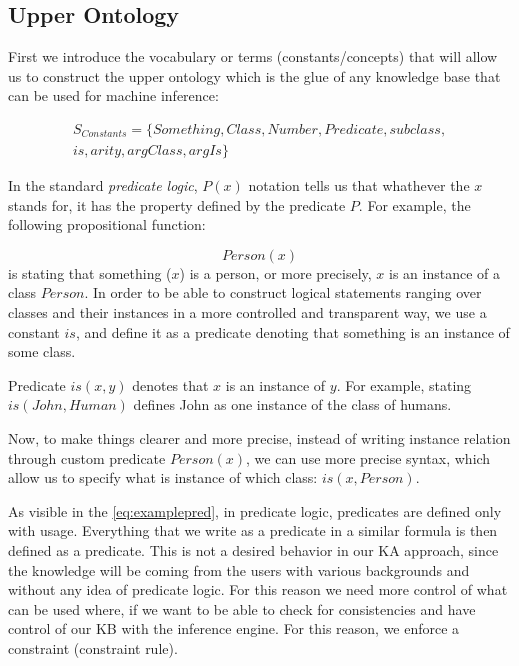 \subsection{Upper Ontology}
\label{section:upperOnto}
First we introduce the vocabulary or terms (constants/concepts) that will allow 
us to construct the upper ontology which is the glue of any knowledge base that 
can be used for machine inference:

\begin{equation}\label{set:terms}
\begin{gathered}
S_{Constants} = \{Something, Class, Number, Predicate, subclass, \\
	is, arity, argClass, argIs\}
\end{gathered}
\end{equation}

In the standard \emph{predicate logic}, $P(x)$ notation tells us that whathever 
the $x$ stands for, it has the property defined by the predicate $P$. 
For example, the following propositional function:

\begin{equation}\label{eq:examplepred}
Person(x)
\end{equation}
is stating that something ($x$) is a person, or more precisely, $x$ is an 
instance of a class $Person$. In order to be able to construct logical 
statements ranging
over classes and their instances in a more controlled and transparent way, we
use a constant $is$, and define it as a predicate denoting that something is an
instance of some class.

\begin{definition}[predicate "$is$"]
\label{const:is}
Predicate $is(x,y)$ denotes that $x$ is an instance of $y$. For example, 
stating $is(John, Human)$ defines John as one instance of the class of humans.
\end{definition}
Now, to make things clearer and more precise, instead of writing instance
relation through custom predicate $Person(x)$, we can use more precise syntax, 
which allow us to specify what is instance of which class: $is(x,Person)$.

As visible in the \autoref{eq:examplepred}, in predicate logic, predicates are
defined only with usage. Everything that we write as a predicate in a similar
formula is then defined as a predicate. This is not a desired behavior in our 
KA approach, since the knowledge will be coming from the users with various
backgrounds and without any idea of predicate logic. For this reason we
need more control of what can be used where, if we want to be able to
check for consistencies and have control of our KB with the inference engine.
For this reason, we enforce a constraint (constraint rule).

